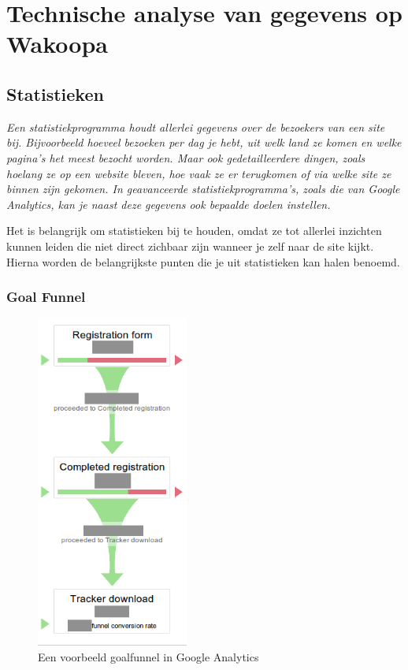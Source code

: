 \documentclass[a4paper, 10pt, pdftex]{report}
\begin{document}
  \newpage
  \chapter{Technische analyse van gegevens op Wakoopa}
    \label{datachapter}
    \newpage
    \section{Statistieken}
    \textit{Een statistiekprogramma houdt allerlei gegevens over de bezoekers van een site bij. Bijvoorbeeld hoeveel bezoeken per dag je hebt, uit welk land ze komen en welke pagina's het meest bezocht worden. Maar ook gedetailleerdere dingen, zoals hoelang ze op een website bleven, hoe vaak ze er terugkomen of via welke site ze binnen zijn gekomen. In geavanceerde statistiekprogramma's, zoals die van Google Analytics, kan je naast deze gegevens ook bepaalde doelen instellen.}

    Het is belangrijk om statistieken bij te houden, omdat ze tot allerlei inzichten kunnen leiden die niet direct zichbaar zijn wanneer je zelf naar de site kijkt. Hierna worden de belangrijkste punten die je uit statistieken kan halen benoemd.

    \subsection{Goal Funnel}
      \begin{figure}
      \caption{Een voorbeeld goalfunnel in Google Analytics}
        \includegraphics[width=50mm]{../images/goalfunnel}
    \end{figure}
\end{document}
